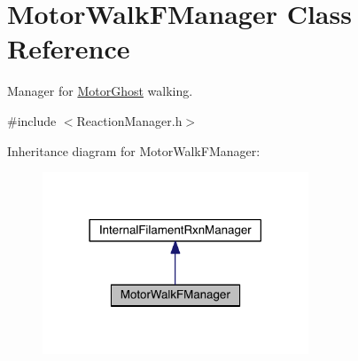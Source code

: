 \hypertarget{classMotorWalkFManager}{\section{Motor\+Walk\+F\+Manager Class Reference}
\label{classMotorWalkFManager}
}


Manager for \hyperlink{classMotorGhost}{Motor\+Ghost} walking.  




{\ttfamily \#include $<$Reaction\+Manager.\+h$>$}



Inheritance diagram for Motor\+Walk\+F\+Manager\+:
\nopagebreak
\begin{figure}[H]
\begin{center}
\leavevmode
\includegraphics[width=225pt]{classMotorWalkFManager__inherit__graph}
\end{center}
\end{figure}


